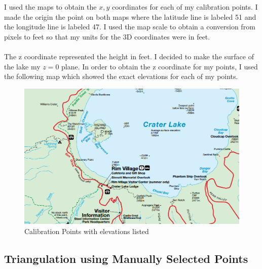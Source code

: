 \documentclass[11pt,psfig]{article}
\begin{document}
I used the maps to obtain the $x,y$ coordinates for each of my calibration points. I made the origin the point on both maps where the latitude line is labeled 51 and the longitude line is labeled 47. I used the map scale to obtain a conversion from pixels to feet so that my units for the 3D coordinates were in feet.  \\
\\
The z coordinate represented the height in feet. I decided to make the surface of the lake my $z=0$ plane. In order to obtain the z coordinate for my points, I used the following map which showed the exact elevations for each of my points. 
\begin{figure}[H]
\centering
\includegraphics[width=\columnwidth]{sfmResults1/elevationsListed.png}
\caption{Calibration Points with elevations listed}
\end{figure}

\newpage

\subsection{Triangulation using Manually Selected Points}
\end{document}
